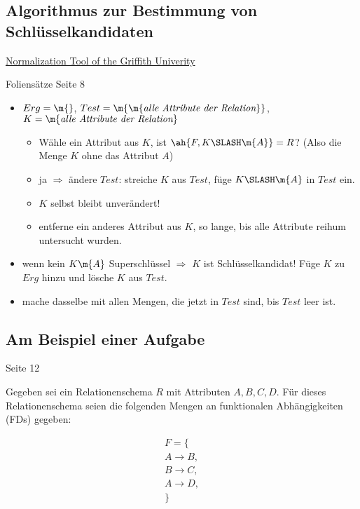 \documentclass{lehramt-informatik-haupt}
\begin{document}
\subsection{Algorithmus zur Bestimmung von Schlüsselkandidaten}

\href{http://www.ict.griffith.edu.au/normalization_tools/normalization/ind.php}
{Normalization Tool of the Griffith Univerity}

Foliensätze Seite 8

\begin{itemize}
\item
$Erg = \m{}$,
$Test = \m{\m{\textit{alle Attribute der Relation}}}$,
$K = \m{\textit{alle Attribute der Relation}}$

\begin{itemize}
\item Wähle ein Attribut aus $K$, ist
$\ah{F,K \SLASH \m{A}} = R$?
(Also die Menge $K$ ohne das Attribut $A$)

\item ja $\Rightarrow$ ändere $\textit{Test}$:
streiche $K$ aus $\textit{Test}$, füge $K \SLASH \m{A}$ in $\textit{Test}$ ein.

\item $K$ selbst bleibt unverändert!

\item entferne ein anderes Attribut aus $K$, so lange, bis alle
Attribute reihum untersucht wurden.
\end{itemize}

\item wenn kein $K\m{A}$ Superschlüssel $\Rightarrow$
$K$ ist Schlüsselkandidat!
Füge $K$ zu $Erg$ hinzu und lösche $K$ aus $\textit{Test}$.

\item mache dasselbe mit allen Mengen, die jetzt in $\textit{Test}$ sind,
bis $\textit{Test}$ leer ist.

\end{itemize}

\subsection{Am Beispiel einer Aufgabe}

Seite 12

Gegeben sei ein Relationenschema $R$ mit Attributen $A, B, C, D$. Für
dieses Relationenschema seien die folgenden Mengen an funktionalen
Abhängigkeiten (FDs) gegeben:

\begin{multline*}
F = \{ \\
  A \rightarrow B,\\
  B \rightarrow C,\\
  A \rightarrow D,\\
\}
\end{multline*}
\end{document}
